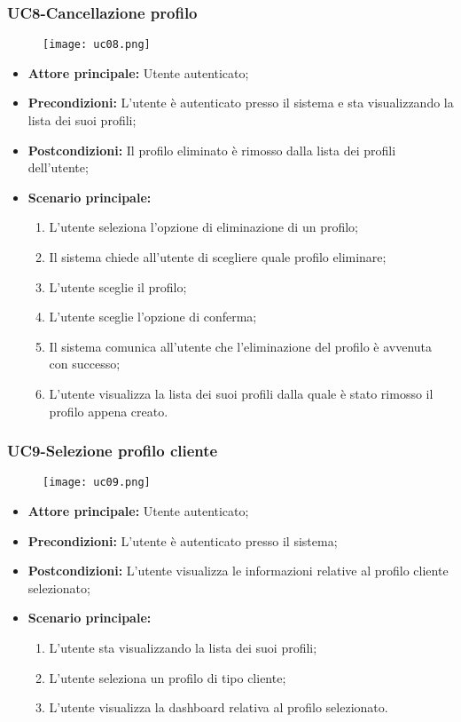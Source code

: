 \pagebreak
\subsubsection{UC8-Cancellazione profilo}
\begin{figure}[h] \texttt{[image: uc08.png]} \end{figure}
\begin{itemize}
\item \textbf{Attore principale:} Utente autenticato;
\item \textbf{Precondizioni:} L'utente è autenticato presso il sistema e sta visualizzando la lista dei suoi profili;
\item \textbf{Postcondizioni:} Il profilo eliminato è rimosso dalla lista dei profili dell'utente;
\item \textbf{Scenario principale:}
\begin{enumerate}
    \item L'utente seleziona l'opzione di eliminazione di un profilo;
    \item Il sistema chiede all'utente di scegliere quale profilo eliminare;
    \item L'utente sceglie il profilo;
    \item L'utente sceglie l'opzione di conferma;
    \item Il sistema comunica all'utente che l'eliminazione del profilo è avvenuta con successo;
    \item L'utente visualizza la lista dei suoi profili dalla quale è stato rimosso il profilo appena creato.
\end{enumerate}
\end{itemize}

\subsubsection{UC9-Selezione profilo cliente}
\begin{figure}[h] \texttt{[image: uc09.png]} \end{figure}
\begin{itemize}
\item \textbf{Attore principale:} Utente autenticato;
\item \textbf{Precondizioni:} L'utente è autenticato presso il sistema;
\item \textbf{Postcondizioni:} L'utente visualizza le informazioni relative al profilo cliente selezionato;
\item \textbf{Scenario principale:}
\begin{enumerate}
    \item L'utente sta visualizzando la lista dei suoi profili;
    \item L'utente seleziona un profilo di tipo cliente;
    \item L'utente visualizza la dashboard relativa al profilo selezionato.
\end{enumerate}
\end{itemize}

